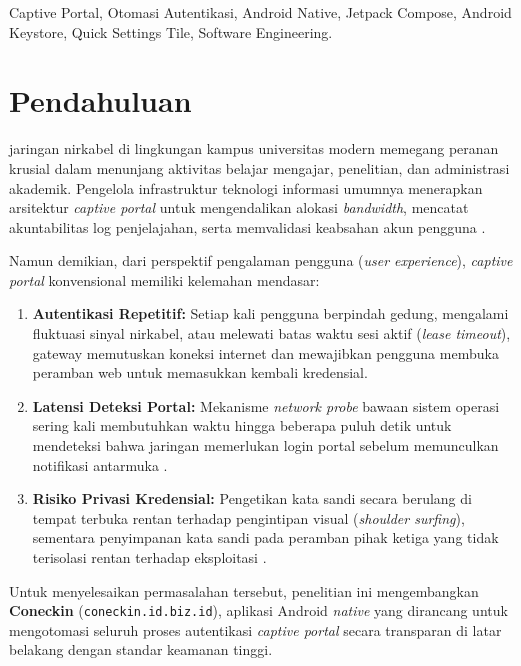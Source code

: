\documentclass[10pt,journal,compsoc]{IEEEtran}
\begin{document}
\begin{IEEEkeywords}
Captive Portal, Otomasi Autentikasi, Android Native, Jetpack Compose, Android Keystore, Quick Settings Tile, Software Engineering.
\end{IEEEkeywords}

\section{Pendahuluan}
 jaringan nirkabel di lingkungan kampus universitas modern memegang peranan krusial dalam menunjang aktivitas belajar mengajar, penelitian, dan administrasi akademik. Pengelola infrastruktur teknologi informasi umumnya menerapkan arsitektur \textit{captive portal} untuk mengendalikan alokasi \textit{bandwidth}, mencatat akuntabilitas log penjelajahan, serta memvalidasi keabsahan akun pengguna \cite{captive_portal_survey}. 

Namun demikian, dari perspektif pengalaman pengguna (\textit{user experience}), \textit{captive portal} konvensional memiliki kelemahan mendasar:
\begin{enumerate}
    \item \textbf{Autentikasi Repetitif:} Setiap kali pengguna berpindah gedung, mengalami fluktuasi sinyal nirkabel, atau melewati batas waktu sesi aktif (\textit{lease timeout}), gateway memutuskan koneksi internet dan mewajibkan pengguna membuka peramban web untuk memasukkan kembali kredensial.
    \item \textbf{Latensi Deteksi Portal:} Mekanisme \textit{network probe} bawaan sistem operasi sering kali membutuhkan waktu hingga beberapa puluh detik untuk mendeteksi bahwa jaringan memerlukan login portal sebelum memunculkan notifikasi antarmuka \cite{network_auth_eval}.
    \item \textbf{Risiko Privasi Kredensial:} Pengetikan kata sandi secara berulang di tempat terbuka rentan terhadap pengintipan visual (\textit{shoulder surfing}), sementara penyimpanan kata sandi pada peramban pihak ketiga yang tidak terisolasi rentan terhadap eksploitasi \cite{android_security_internals}.
\end{enumerate}

Untuk menyelesaikan permasalahan tersebut, penelitian ini mengembangkan \textbf{Coneckin} (\texttt{coneckin.id.biz.id}), aplikasi Android \textit{native} yang dirancang untuk mengotomasi seluruh proses autentikasi \textit{captive portal} secara transparan di latar belakang dengan standar keamanan tinggi.
\end{document}

